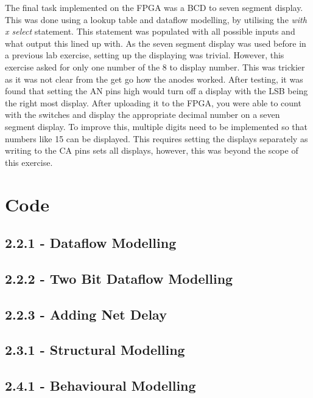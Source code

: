 \documentclass[a4paper, 12pt]{article}
\begin{document}
		\par
		The final task implemented on the FPGA was a BCD to seven segment display. This was done using a lookup table and dataflow modelling, by utilising the \textit{with x select} statement. This statement was populated with all possible inputs and what output this lined up with. As the seven segment display was used before in a previous lab exercise, setting up the displaying was trivial. However, this exercise asked for only one number of the 8 to display number. This was trickier as it was not clear from the get go how the anodes worked. After testing, it was found that setting the AN pins high would turn off a display with the LSB being the right most display. After uploading it to the FPGA, you were able to count with the switches and display the appropriate decimal number on a seven segment display. To improve this, multiple digits need to be implemented so that numbers like 15 can be displayed. This requires setting the displays separately as writing to the CA pins sets all displays, however, this was beyond the scope of this exercise.

	\section{Code}
		\subsection{2.2.1 - Dataflow Modelling}
			
			
		\subsection{2.2.2 - Two Bit Dataflow Modelling}
			
		\subsection{2.2.3 - Adding Net Delay}
			
		\subsection{2.3.1 - Structural Modelling}
			
		\subsection{2.4.1 - Behavioural Modelling}
			
\end{document}
